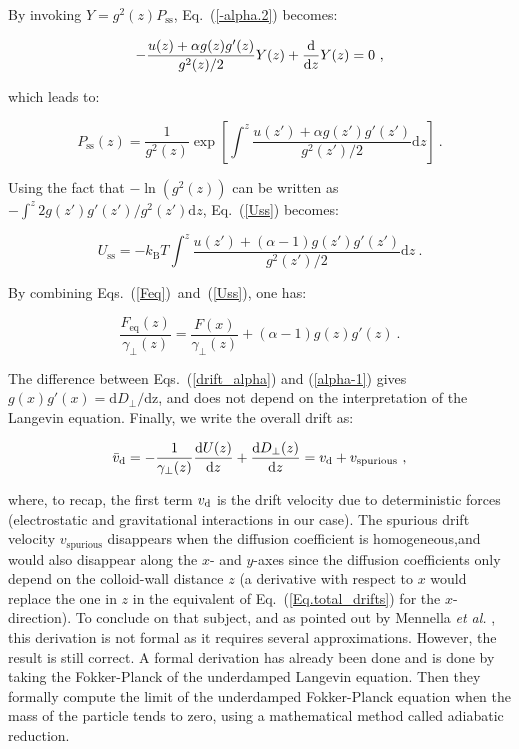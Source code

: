 By invoking $Y=g^2(z)P_\mathrm{ss}$, Eq.~(\ref{-alpha.2}) becomes:

\begin{equation}
	-\frac{u(z) + \alpha g(z)g'(z)}{g^2(z) / 2} Y(z) + \frac{\textnormal{d} }{\textnormal{d} z} Y(z)=0~,
\end{equation}

which leads to:

\begin{equation}
	P_\mathrm{ss}(z) = \frac{1}{g^2(z)} \exp \left[ \int^{z} \frac{u(z') + \alpha g(z')g'(z')}{g^2(z') / 2} \mathrm{d}z \right] ~.
	\label{-alpha.3}
\end{equation}

Using the fact that $-\ln(g^2(z))$ can be written as $-\int^{z} 2 g(z')g'(z') / g^2(z') \mathrm{d}z$, Eq.~(\ref{Uss}) becomes:

\begin{equation}
	U_\mathrm{ss} = -k_\mathrm{B}T \int^{z} \frac{u(z') + (\alpha - 1) g(z')g'(z')}{g^2(z') / 2} \mathrm{d}z~.
\end{equation}



By combining Eqs.~(\ref{Feq})~and~(\ref{Uss}), one has:

\begin{equation}
	\frac{F_\mathrm{eq}(z)}{\gamma_\bot(z)} = \frac{F(x)}{\gamma_\bot(z)} + (\alpha - 1)g(z)g'(z)~.
	\label{alpha-1}
\end{equation}

The difference between Eqs.~(\ref{drift_alpha}) and (\ref{alpha-1}) gives $g(x)g'(x) = \mathrm{d}D_\bot/ \mathrm{dz}$, and does not depend on the interpretation of the Langevin equation. Finally, we write the overall drift as:

\begin{equation}
	\bar{v}_\mathrm{d} = -\frac{1}{\gamma_\bot(z)} \frac{\textnormal{d} U(z)}{\textnormal{d} z} + \frac{\mathrm{d} D_\bot(z)}{\mathrm{d}z}  = v_\mathrm{d} + v_\mathrm{spurious}~,
	\label{Eq.total_drifts}
\end{equation}

where, to recap, the first term $v_\textnormal{d}$ is the drift velocity due to deterministic forces (electrostatic and gravitational interactions in our case). The spurious drift velocity $v_\mathrm{spurious}$ disappears when the diffusion coefficient is homogeneous,and would also disappear along the $x$- and $y$-axes since the diffusion coefficients only depend on the colloid-wall distance $z$ (a derivative with respect to $x$ would replace the one in $z$ in the equivalent of Eq.~(\ref{Eq.total_drifts}) for the $x$-direction). To conclude on that subject, and as pointed out by Mennella \textit{et al.} \cite{mannella_ito_2012}, this derivation is not formal as it requires several approximations. However, the result is still correct. A formal derivation has already been done \cite{sancho_adiabatic_1982} and is done by taking the Fokker-Planck of the underdamped Langevin equation. Then they formally compute the limit of the underdamped Fokker-Planck equation when the mass of the particle tends to zero, using a mathematical method called adiabatic reduction.

